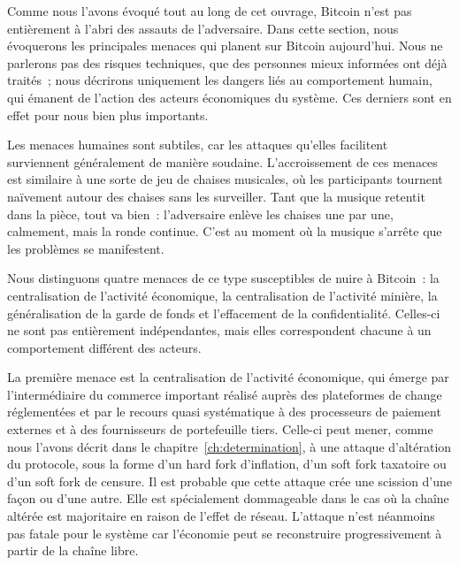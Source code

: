 Comme nous l'avons évoqué tout au long de cet ouvrage, Bitcoin n'est pas entièrement à l'abri des assauts de l'adversaire. Dans cette section, nous évoquerons les principales menaces qui planent sur Bitcoin aujourd'hui. Nous ne parlerons pas des risques techniques, que des personnes mieux informées ont déjà traités~; nous décrirons uniquement les dangers liés au comportement humain, qui émanent de l'action des acteurs économiques du système. Ces derniers sont en effet pour nous bien plus importants.

Les menaces humaines sont subtiles, car les attaques qu'elles facilitent surviennent généralement de manière soudaine. L'accroissement de ces menaces est similaire à une sorte de jeu de chaises musicales, où les participants tournent naïvement autour des chaises sans les surveiller. Tant que la musique retentit dans la pièce, tout va bien~: l'adversaire enlève les chaises une par une, calmement, mais la ronde continue. C'est au moment où la musique s'arrête que les problèmes se manifestent.

Nous distinguons quatre menaces de ce type susceptibles de nuire à Bitcoin~: la centralisation de l'activité économique, la centralisation de l'activité minière, la généralisation de la garde de fonds et l'effacement de la confidentialité. Celles-ci ne sont pas entièrement indépendantes, mais elles correspondent chacune à un comportement différent des acteurs.

La première menace est la centralisation de l'activité économique, qui émerge par l'intermédiaire du commerce important réalisé auprès des plateformes de change réglementées et par le recours quasi systématique à des processeurs de paiement externes et à des fournisseurs de portefeuille tiers. Celle-ci peut mener, comme nous l'avons décrit dans le chapitre~\ref{ch:determination}, à une attaque d'altération du protocole, sous la forme d'un hard fork d'inflation, d'un soft fork taxatoire ou d'un soft fork de censure. Il est probable que cette attaque crée une scission d'une façon ou d'une autre. Elle est spécialement dommageable dans le cas où la chaîne altérée est majoritaire en raison de l'effet de réseau. L'attaque n'est néanmoins pas fatale pour le système car l'économie peut se reconstruire progressivement à partir de la chaîne libre.

